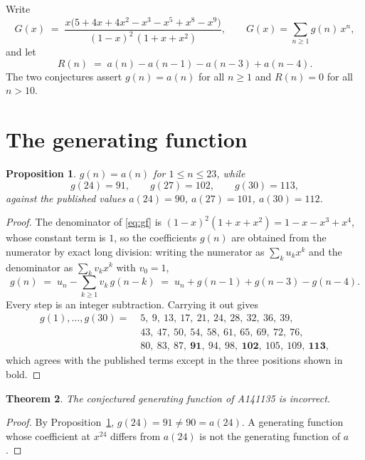 \documentclass[11pt,a4paper]{article}
\theoremstyle{plain}
\newtheorem{theorem}{Theorem}
\newtheorem{proposition}[theorem]{Proposition}
\theoremstyle{definition}
\begin{document}
Write
\begin{equation}\label{eq:gf}
G(x)\;=\;\frac{x\bigl(5 + 4x + 4x^{2} - x^{3} - x^{5} + x^{8} - x^{9}\bigr)}
{(1 - x)^{2}\,(1 + x + x^{2})},
\qquad
G(x)=\sum_{n\ge1} g(n)\,x^{n},
\end{equation}
and let
\begin{equation}\label{eq:rec}
R(n)\;=\;a(n)-a(n-1)-a(n-3)+a(n-4).
\end{equation}
The two conjectures assert $g(n)=a(n)$ for all $n\ge1$ and $R(n)=0$ for all $n>10$.

\section{The generating function}

\begin{proposition}\label{prop:gf}
$g(n)=a(n)$ for $1\le n\le 23$, while
\[
g(24)=91,\qquad g(27)=102,\qquad g(30)=113,
\]
against the published values $a(24)=90$, $a(27)=101$, $a(30)=112$.
\end{proposition}

\begin{proof}
The denominator of \eqref{eq:gf} is $(1-x)^{2}(1+x+x^{2})=1-x-x^{3}+x^{4}$, whose constant
term is $1$, so the coefficients $g(n)$ are obtained from the numerator by exact long
division: writing the numerator as $\sum_{k}u_{k}x^{k}$ and the denominator as
$\sum_{k}v_{k}x^{k}$ with $v_{0}=1$,
\[
g(n)\;=\;u_{n}-\sum_{k\ge1} v_{k}\,g(n-k)
\;=\;u_{n}+g(n-1)+g(n-3)-g(n-4).
\]
Every step is an integer subtraction. Carrying it out gives
\[
\begin{aligned}
g(1),\dots,g(30)=\;&5,\ 9,\ 13,\ 17,\ 21,\ 24,\ 28,\ 32,\ 36,\ 39,\\
&43,\ 47,\ 50,\ 54,\ 58,\ 61,\ 65,\ 69,\ 72,\ 76,\\
&80,\ 83,\ 87,\ \mathbf{91},\ 94,\ 98,\ \mathbf{102},\ 105,\ 109,\ \mathbf{113},
\end{aligned}
\]
which agrees with the published terms except in the three positions shown in bold.
\end{proof}

\begin{theorem}\label{thm:gf}
The conjectured generating function of A141135 is incorrect.
\end{theorem}

\begin{proof}
By Proposition~\ref{prop:gf}, $g(24)=91\ne 90=a(24)$. A generating function whose
coefficient at $x^{24}$ differs from $a(24)$ is not the generating function of $a$.
\end{proof}
\end{document}
